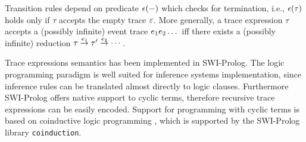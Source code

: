 Transition rules depend on predicate \(\mathit{\epsilon}(-)\) which checks for termination, i.e., \(\mathit{\epsilon}(\tau)\) holds only if \(\tau\) accepts the empty trace \(\varepsilon\).
More generally, a trace expression \(\tau\) accepts a (possibly infinite) event trace \(e_1e_2\dots\) iff there exists a (possibly infinite) reduction \(\tau \stackrel{{e_1}}{\rightarrow} \tau' \stackrel{{e_2}}{\rightarrow} \dotsb\).

Trace expressions semantics has been implemented in SWI-Prolog.
The logic programming paradigm is well suited for inference systems implementation, since inference rules can be translated almost directly to logic clauses.
Furthermore SWI-Prolog offers native support to cyclic terms, therefore recursive trace expressions can be easily encoded.
Support for programming with cyclic terms is based on coinductive logic programming \cite{CoLP06}, which is supported by the SWI-Prolog library \texttt{coinduction}.
